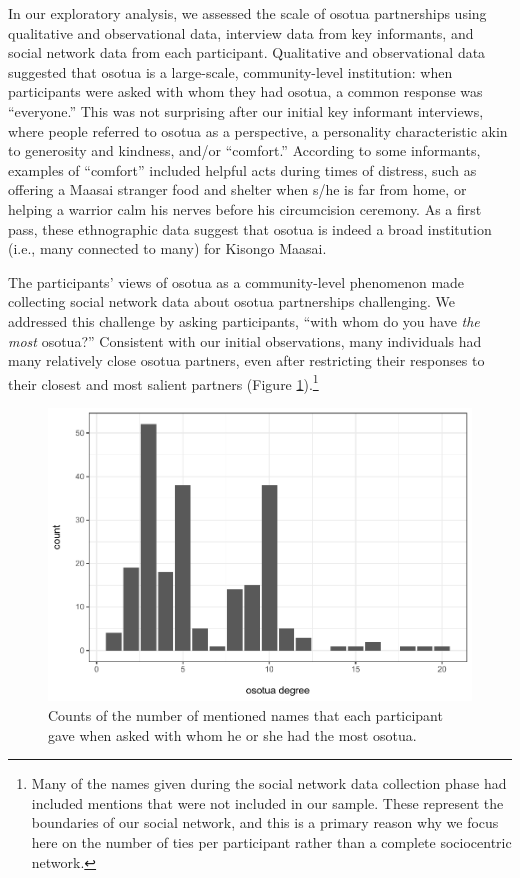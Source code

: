 \documentclass[
]{article}
\begin{document}
In our exploratory analysis, we assessed the scale of osotua partnerships using qualitative and observational data, interview data from key informants, and social network data from each participant. Qualitative and observational data suggested that osotua is a large-scale, community-level institution: when participants were asked with whom they had osotua, a common response was ``everyone.'' This was not surprising after our initial key informant interviews, where people referred to osotua as a perspective, a personality characteristic akin to generosity and kindness, and/or ``comfort.'' According to some informants, examples of ``comfort'' included helpful acts during times of distress, such as offering a Maasai stranger food and shelter when s/he is far from home, or helping a warrior calm his nerves before his circumcision ceremony. As a first pass, these ethnographic data suggest that osotua is indeed a broad institution (i.e., many connected to many) for Kisongo Maasai.

The participants' views of osotua as a community-level phenomenon made collecting social network data about osotua partnerships challenging. We addressed this challenge by asking participants, ``with whom do you have \emph{the most} osotua?'' Consistent with our initial observations, many individuals had many relatively close osotua partners, even after restricting their responses to their closest and most salient partners (Figure \ref{fig:degosotuaplot}).\footnote{Many of the names given during the social network data collection phase had included mentions that were not included in our sample. These represent the boundaries of our social network, and this is a primary reason why we focus here on the number of ties per participant rather than a complete sociocentric network.}

\begin{figure}
\centering
\includegraphics{needBasedSharing-paper_files/figure-latex/degosotuaplot-1.pdf}
\caption{\label{fig:degosotuaplot}Counts of the number of mentioned names that each participant gave when asked with whom he or she had the most osotua.}
\end{figure}
\end{document}
